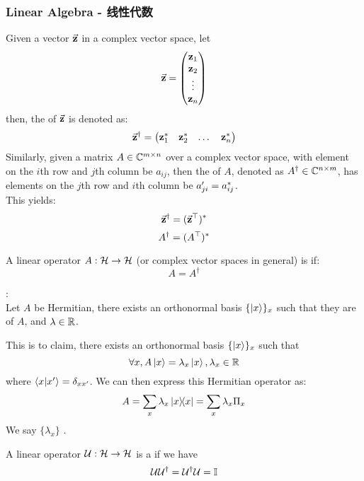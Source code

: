 \subsubsection{Linear Algebra - 线性代数}
\begin{definition}
    Given a vector $\vec{\mathbf{z}}$ in a complex vector space, let
    $$\vec{\mathbf{z}} = \begin{pmatrix}
        \mathbf{z}_1 \\
        \mathbf{z}_2 \\
        \vdots \\
        \mathbf{z}_n
    \end{pmatrix}$$
    then, the  of $\vec{\mathbf{z}}$ is denoted as:
    $$\vec{\mathbf{z}}^{\dagger} = \begin{pmatrix}
        \mathbf{z}_1^{*} & \mathbf{z}_2^{*} & \dots & \mathbf{z}_n^{*}
    \end{pmatrix}$$
    Similarly, given a matrix $A \in \mathbb{C}^{m \times n}$ over a complex vector space, with element on the $i$th row and $j$th column be $a_{ij}$, then the  of $A$, denoted as $A^{\dagger} \in \mathbb{C}^{n \times m}$, has elements on the $j$th row and $i$th column be $a_{ji}' = a_{ij}^{*}$. \\
    This yields:
    $$\vec{\mathbf{z}}^{\dagger} = (\vec{\mathbf{z}}^{\top})^{*}$$
    $$A^{\dagger} = (A^{\top})^{*}$$
\end{definition}
\label{subsec:hermitian}
\begin{definition}
    A linear operator $A: \mathcal{H} \to \mathcal{H}$ (or complex vector spaces in general) is  if:
    $$A = A^{\dagger}$$
\end{definition}
\begin{theorem}
    : \\
    Let $A$ be Hermitian, there exists an orthonormal basis $\{\ket{x}\}_x$ such that they are  of $A$, and  $\lambda \in \mathbb{R}$.
\end{theorem}
This is to claim, there exists an orthonormal basis $\{\ket{x}\}_x$ such that
$$\forall x, A \ket{x} = \lambda_x \ket{x}, \lambda_x \in \mathbb{R}$$
where $\braket{x}{x'} = \delta_{xx'}$. We can then express this Hermitian operator as:
$$A = \Sumi{x} \lambda_x \dyad{x}{x} = \Sumi{x} \lambda_x \proj{x}$$
We say $\{\lambda_x\}$ .
\label{subsec:unitary}
\begin{definition}
    A linear operator $\mathcal{U}: \mathcal{H} \to \mathcal{H}$ is a  if we have
    $$\mathcal{U}\mathcal{U}^{\dagger} = \mathcal{U}^{\dagger}\mathcal{U} = \mathbb{I}$$
\end{definition}
